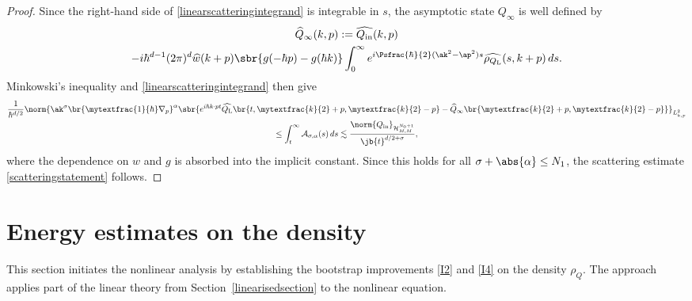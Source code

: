 \begin{proof}
\pagebreak[2]\noindent
Since the right-hand side of \eqref{linearscatteringintegrand} is integrable in $s$, the asymptotic state $Q_\infty$ is well defined by
\begin{multline*}
\widehat Q_\infty(k,p):=\widehat{Q_{\mathrm{in}}}(k,p)\\
-i\hbar^{d-1}(2\pi)^d\widehat w(k+p)\sbr{g(-\hbar p)-g(\hbar k)}\int_0^\infty e^{i\Psfrac{\hbar}{2}(\ak^2-\ap^2)s}\widehat{\rho_{Q_{\mathrm{L}}}}(s,k+p)\,ds.
\end{multline*}
Minkowski's inequality and \eqref{linearscatteringintegrand} then give
\begin{multline*}
\frac{1}{\hbar^{d/2}}\norm{\ak^{\sigma}\br{\mytextfrac{1}{\hbar}\nabla_p}^\alpha\sbr{e^{i\hbar k\cdot pt}\widehat{Q_{\mathrm{L}}}\br{t,\mytextfrac{k}{2}+p,\mytextfrac{k}{2}-p}-\widehat Q_{\infty}\br{\mytextfrac{k}{2}+p,\mytextfrac{k}{2}-p}}}_{L^2_{k,p}}\\
\leq\int_t^\infty\mathcal A_{\sigma,\alpha}(s)\,ds
\lesssim\frac{\norm{Q_{\mathrm{in}}}_{\mathcal H^{N_0+1}_{M,M}}}{\jb{t}^{d/2+\sigma}},
\end{multline*}
where the dependence on $w$ and $g$ is absorbed into the implicit constant. Since this holds for all $\sigma+\abs{\alpha}\leq N_1$, the scattering estimate \eqref{scatteringstatement} follows.
\end{proof}

\section{Energy estimates on the density}\label{sectiondensity}
This section initiates the nonlinear analysis by establishing the bootstrap improvements \eqref{I2} and \eqref{I4} on the density $\rho_Q$. The approach applies part of the linear theory from Section~\ref{linearisedsection} to the nonlinear equation.

